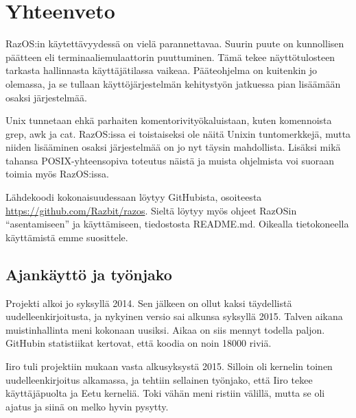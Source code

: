 \chapter{Yhteenveto}

RazOS:in käytettävyydessä on vielä parannettavaa. Suurin puute on kunnollisen päätteen eli terminaaliemulaattorin puuttuminen. Tämä tekee näyttötulosteen tarkasta hallinnasta käyttäjätilassa vaikeaa. Pääteohjelma on kuitenkin jo olemassa, ja se tullaan käyttöjärjestelmän kehitystyön jatkuessa pian lisäämään osaksi järjestelmää.

\par

Unix tunnetaan ehkä parhaiten komentorivityökaluistaan, kuten komennoista grep, awk ja cat. RazOS:issa ei toistaiseksi ole näitä Unixin tuntomerkkejä, mutta niiden lisääminen osaksi järjestelmää on jo nyt täysin mahdollista. Lisäksi mikä tahansa POSIX-yhteensopiva toteutus näistä ja muista ohjelmista voi suoraan toimia myös RazOS:issa.

\par

Lähdekoodi kokonaisuudessaan löytyy GitHubista, osoiteesta \url{https://github.com/Razbit/razos}. Sieltä löytyy myös ohjeet RazOSin ``asentamiseen'' ja käyttämiseen, tiedostosta README.md. Oikealla tietokoneella käyttämistä emme suosittele.

\section{Ajankäyttö ja työnjako}

Projekti alkoi jo syksyllä 2014. Sen jälkeen on ollut kaksi täydellistä uudelleenkirjoitusta, ja nykyinen versio sai alkunsa syksyllä 2015. Talven aikana muistinhallinta meni kokonaan uusiksi. Aikaa on siis mennyt todella paljon. GitHubin statistiikat kertovat, että koodia on noin 18000 riviä.

\par

Iiro tuli projektiin mukaan vasta alkusyksystä 2015. Silloin oli kernelin toinen uudelleenkirjoitus alkamassa, ja tehtiin sellainen työnjako, että Iiro tekee käyttäjäpuolta ja Eetu kerneliä. Toki vähän meni ristiin välillä, mutta se oli ajatus ja siinä on melko hyvin pysytty.
